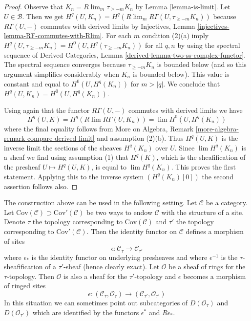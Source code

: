 \begin{proof}
Observe that $K_n = R\lim_m \tau_{\geq -m} K_n$ by Lemma \ref{lemma-is-limit}.
Let $U \in \mathcal{B}$.
Then we get $H^q(U, K_n) = H^q(R\lim_m R\Gamma(U, \tau_{\geq -m} K_n))$ because
$R\Gamma(U, -)$ commutes with derived limits by
Injectives, Lemma \ref{injectives-lemma-RF-commutes-with-Rlim}.
For each $m$ condition (2)(a) imply
$H^q(U, \tau_{\geq -m} K_n) = H^0(U, H^q(\tau_{\geq -m} K_n))$
for all $q, n$ by using the spectral sequence of
Derived Categories, Lemma \ref{derived-lemma-two-ss-complex-functor}.
The spectral sequence converges because $\tau_{\geq -m}K_n$ is bounded
below (and so this argument simplifies considerably when $K_n$ is
bounded below). This value is constant and equal to $H^0(U, H^q(K_n))$
for $m > |q|$. We conclude that $H^q(U, K_n) = H^0(U, H^q(K_n))$.

\medskip\noindent
Using again that the functor $R\Gamma(U, -)$ commutes with derived limits
we have
$$
H^q(U, K) = H^q(R\lim R\Gamma(U, K_n)) = \lim H^0(U, H^q(K_n))
$$
where the final equality follows from
More on Algebra, Remark \ref{more-algebra-remark-compare-derived-limit}
and assumption (2)(b). Thus $H^q(U, K)$ is the inverse limit
the sections of the sheaves $H^q(K_n)$ over $U$. Since
$\lim H^q(K_n)$ is a sheaf we find using assumption (1) that $H^q(K)$,
which is the sheafification of the presheaf $U \mapsto H^q(U, K)$,
is equal to $\lim H^q(K_n)$. This proves the first statement.
Applying this to the inverse system $(H^q(K_n)[0])$ the second
assertion follows also.
\end{proof}

\noindent
The construction above can be used in the following setting.
Let $\mathcal{C}$ be a category. Let
$\text{Cov}(\mathcal{C}) \supset \text{Cov}'(\mathcal{C})$
be two ways to endow $\mathcal{C}$ with the structure of a site.
Denote $\tau$ the topology corresponding to $\text{Cov}(\mathcal{C})$
and $\tau'$ the topology corresponding to $\text{Cov}'(\mathcal{C})$.
Then the identity functor on $\mathcal{C}$ defines a morphism
of sites
$$
\epsilon : \mathcal{C}_\tau \longrightarrow \mathcal{C}_{\tau'}
$$
where $\epsilon_*$ is the identity functor on underlying presheaves and
where $\epsilon^{-1}$ is the $\tau$-sheafification of a $\tau'$-sheaf
(hence clearly exact). Let $\mathcal{O}$ be a sheaf of rings for the
$\tau$-topology. Then $\mathcal{O}$ is also a sheaf for the $\tau'$-topology
and $\epsilon$ becomes a morphism of ringed sites
$$
\epsilon :
(\mathcal{C}_\tau, \mathcal{O}_\tau)
\longrightarrow
(\mathcal{C}_{\tau'}, \mathcal{O}_{\tau'})
$$
In this situation we can sometimes point out subcategories of
$D(\mathcal{O}_\tau)$ and $D(\mathcal{O}_{\tau'})$ which are
identified by the functors $\epsilon^*$ and $R\epsilon_*$.

